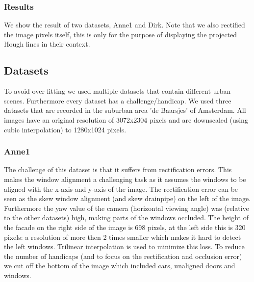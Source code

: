 \subsubsection{Results} %
We show the result of two datasets, Anne1 and Dirk.
Note that we also rectified the image pixels itself, this is only for
the purpose of displaying the projected Hough lines in their context.

\newpage
{}
\clearpage

\newpage
{}




\subsection{Datasets}
To avoid over fitting we used multiple datasets that contain different urban
scenes.  Furthermore every dataset has a challenge/handicap.
We used three datasets that are recorded in the suburban area
'de Baarsjes' of Amsterdam.  All images have an original resolution of 3072x2304
pixels and are downscaled (using cubic interpolation) to 1280x1024 pixels.

\subsubsection{Anne1}
The challenge of this dataset is that it suffers from rectification errors.
This makes the window alignment a challenging task as it assumes the windows to
be aligned with the x-axis and y-axis of the image.
The rectification error can be seen as the skew window alignment (and skew
drainpipe) on the left of the image. 
Furthermore the yaw value of the camera (horizontal viewing angle) was (relative
to the other datasets) high, making parts of the windows occluded.  The height
of the facade on the right side of the image is 698 pixels, at the left side this
is 320 pixels: a resolution of more then 2 times smaller which makes it hard to detect
the left windows. Trilinear interpolation is used to minimize this loss.
To reduce the number of handicaps (and to focus on the rectification and
occlusion error) we cut off the bottom of the image which included cars, unaligned doors and windows.
\clearpage

